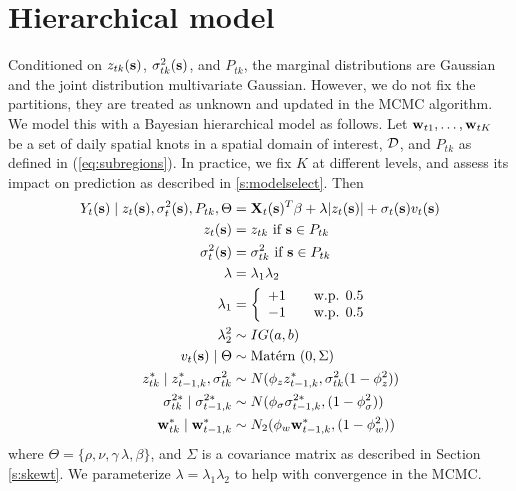 \documentclass[useAMS,usenatbib,referee]{biom}
\begin{document}
\section{Hierarchical model}\label{s:hier}
Conditioned on $z_{tk}(\mbox{\bf s})$, $\sigma^2_{tk}(\mbox{\bf s})$, and $P_{tk}$, the marginal distributions are Gaussian and the joint distribution multivariate Gaussian.
However, we do not fix the partitions, they are treated as unknown and updated in the MCMC algorithm.
We model this with a Bayesian hierarchical model as follows.
Let $\mbox{\bf w}_{t1}, \ldots, \mbox{\bf w}_{tK}$ be a set of daily spatial knots in a spatial domain of interest, $\calD$, and $P_{tk}$ as defined in (\ref{eq:subregions}).
In practice, we fix $K$ at different levels, and assess its impact on prediction as described in \ref{s:modelselect}.
Then
\begin{align}
   Y_t(\bs) \mid z_{t}(\bs), \sigma_t^2(\bs), P_{tk}, \Theta &= \bX_t(\bs)^T \beta + \lambda |z_t(\bs)| + \sigma_t(\bs) v_t(\bs) \label{eq:hier}\\
   z_t(\bs) &= z_{tk} \text{ if } \bs \in P_{tk}\nonumber\\
   \sigma^2_{t}(\bs) &= \sigma^2_{tk} \text{ if } \bs \in P_{tk}\nonumber\\
   \lambda &= \lambda_1 \lambda_2\nonumber\\
   \lambda_1 &= \left\{ \begin{array}{ll}
      +1 \quad & \text{w.p. } 0.5\\
      -1 \quad & \text{w.p. } 0.5
   \end{array}\right.\nonumber\\
   \lambda^2_2 & \sim IG(a, b)\nonumber\\
   v_t(\bs) \mid \Theta &\sim \Matern(0, \Sigma)\nonumber\\
   z^*_{tk} \mid z^*_{t-1, k}, \sigma^2_{tk} &\sim N(\phi_z z^*_{t-1, k}, \sigma^2_{tk} (1 - \phi_z^2))\nonumber\\
   \sigma^{2*}_{tk} \mid \sigma^{2*}_{t-1, k} &\sim N(\phi_\sigma \sigma^{2*}_{t-1, k}, (1 - \phi_\sigma^2))\nonumber\\
   \bw^*_{tk} \mid \bw^*_{t-1, k} &\sim N_2(\phi_w \bw^*_{t-1, k}, (1 - \phi_w^2)) \nonumber
\end{align}
where $\Theta = \{\rho, \nu, \gamma\, \lambda, \beta\}$, and $\Sigma$ is a \Matern covariance matrix as described in Section \ref{s:skewt}.
We parameterize $\lambda = \lambda_1 \lambda_2$ to help with convergence in the MCMC.
\end{document}
